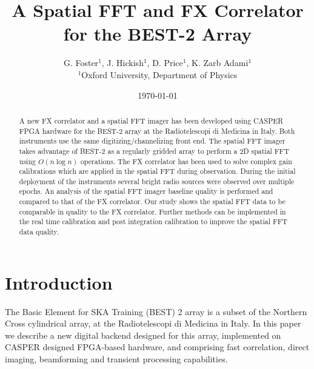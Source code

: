 \documentclass[useAMS,macros,usenatbib,onecolumn]{mn2e}
\title[]{A Spatial FFT and FX Correlator for the BEST-2 Array}
\author[G. Foster, J. Hickish, D. Price and K. Zarb Adami]{G. Foster$^{1}$, J. Hickish$^{1}$, D. Price$^{1}$, K. Zarb Adami$^{1}$\\
$^{1}$Oxford University, Department of Physics}
\begin{document}
\date{\today}

\pagerange{\pageref{firstpage}--\pageref{lastpage}} 

\maketitle

\begin{abstract}
A new FX correlator and a spatial FFT imager has been developed using CASPER FPGA hardware for the BEST-2 array at the Radiotelescopi di Medicina in Italy.
Both instruments use the same digitizing/channelizing front end.
The spatial FFT imager takes advantage of BEST-2 as a regularly gridded array to perform a 2D spatial FFT using $O(n \log n)$ operations.
The FX correlator has been used to solve complex gain calibrations which are applied in the spatial FFT during observation.
During the initial deployment of the instruments several bright radio sources were observed over multiple epochs.
An analysis of the spatial FFT imager baseline quality is performed and compared to that of the FX correlator.
Our study shows the spatial FFT data to be comparable in quality to the FX correlator.
Further methods can be implemented in the real time calibration and post integration calibration to improve the spatial FFT data quality.
\end{abstract}

\section{Introduction}

The Basic Element for SKA Training (BEST) 2 array is a subset of the Northern Cross cylindrical array, at the Radiotelescopi di Medicina in Italy.
In this paper we describe a new digital backend designed for this array, implemented on CASPER \citep{casper} designed FPGA-based hardware, and comprising fast correlation, direct imaging, beamforming and transient processing capabilities.
\end{document}
